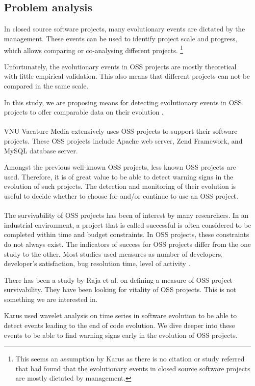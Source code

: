 \subsection{Problem analysis}
\paragraph{}
In closed source software projects, many evolutionary events are dictated by the
management. These events can be used to identify project scale and progress,
which allows comparing or co-analysing different projects. \footnote{This seems
an assumption by Karus as there is no citation or study referred that had found
that the evolutionary events in closed source software projects are mostly
dictated by management.}

Unfortunately, the evolutionary events in OSS projects are
mostly theoretical with little empirical validation. This also means that
different projects can not be compared in the same scale.

In this study, we are proposing means for detecting evolutionary events in OSS
projects to offer comparable data on their evolution \cite{karus2013}.

\paragraph{}
VNU Vacature Media extensively uses OSS projects to support their software
projects. These OSS projects include Apache web server, Zend Framework,
and MySQL database server.

Amongst the previous well-known OSS projects, less known OSS projects are used.
Therefore, it is of great value to be able to detect warning signs in the
evolution of such projects. The detection and monitoring of their evolution is
useful to decide whether to choose for and/or continue to use an OSS project.

\paragraph{}
The survivability of OSS projects has been of interest by many researchers. In
an industrial environment, a project that is called successful is often
considered to be completed within time and budget constraints. In OSS projects,
these constraints do not always exist. The indicators of success for OSS
projects differ from the one study to the other. Most studies used measures as
number of developers, developer's satisfaction, bug resolution time, level of
activity \cite{samoladas2010}.

There has been a study by Raja et al. \cite{raja2012} on defining a measure of
OSS project survivability. They have been looking for vitality of OSS projects.
This is not something we are interested in.

Karus used wavelet analysis on time series in software evolution to be able to
detect events leading to the end of code evolution. We dive deeper into these
events to be able to find warning signs early in the evolution of OSS projects.
